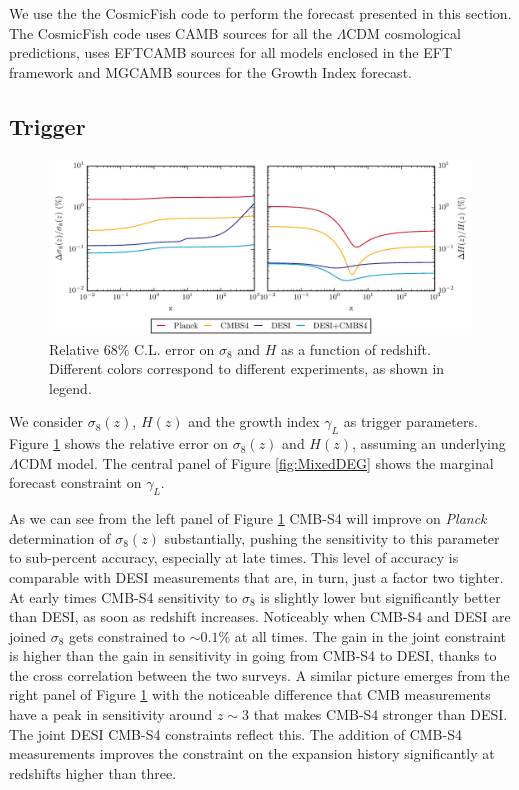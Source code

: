 We use the the CosmicFish code \cite{Raveri:2016xof,Raveri:2016leq} to perform the forecast presented in this section. The CosmicFish code uses CAMB sources \cite{Lewis:1999bs,Challinor:2011bk} for all the $\Lambda$CDM cosmological predictions, uses EFTCAMB sources \cite{Hu:2013twa,Raveri:2014cka} for all models enclosed in the EFT framework and MGCAMB sources \cite{Zhao:2008bn,Hojjati:2011ix} for the Growth Index forecast.

\subsection{Trigger}

\begin{figure}[!tb]
\begin{center}
\includegraphics[width=1.0\textwidth]{DarkEnergy/1_Thomographic}
\caption{Relative $68\%$ C.L. error on $\sigma_{8}$ and $H$ as a function of redshift. Different colors correspond to different experiments, as shown in legend.}\label{fig:GrowthExpansion}
\end{center}
\end{figure}

We consider $\sigma_8(z)$, $H(z)$ and the growth index $\gamma_{L}$ as trigger parameters. Figure \ref{fig:GrowthExpansion} shows the relative error on $\sigma_8(z)$ and $H(z)$, assuming an underlying $\Lambda$CDM model. The central panel of Figure \ref{fig:MixedDEG} shows the marginal forecast constraint on $\gamma_{L}$. 

As we can see from the left panel of Figure \ref{fig:GrowthExpansion} CMB-S4 will improve on {\it Planck} determination of $\sigma_{8}(z)$ substantially, pushing the sensitivity to this parameter to sub-percent accuracy, especially at late times. 
This level of accuracy is comparable with DESI measurements that are, in turn, just a factor two tighter.
At early times CMB-S4 sensitivity to $\sigma_{8}$ is slightly lower but significantly better than DESI, as soon as redshift increases.
Noticeably when CMB-S4 and DESI are joined $\sigma_{8}$ gets constrained to $\sim 0.1\%$ at all times. The gain in the joint constraint is higher than the gain in sensitivity in going from CMB-S4 to DESI, thanks to the cross correlation between the two surveys.
%
A similar picture emerges from the right panel of Figure \ref{fig:GrowthExpansion} with the noticeable difference that CMB measurements have a peak in sensitivity around $z\sim 3$ that makes CMB-S4 stronger than DESI. The joint DESI CMB-S4 constraints reflect this. The addition of CMB-S4 measurements improves the constraint on the expansion history significantly at redshifts higher than three.

